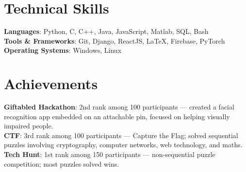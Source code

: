 \documentclass[a4paper,10pt]{article}
\begin{document}
\section{Technical Skills}
 \begin{itemize}[leftmargin=0.15in, label={}]
    \small{\item{
     \textbf{Languages}{: Python, C, C++, Java, JavaScript, Matlab, SQL, Bash} \\
     \textbf{Tools \& Frameworks}{: Git, Django, ReactJS, \LaTeX, Firebase, PyTorch} \\
     \textbf{Operating Systems}{: Windows, Linux}
    }}
 \end{itemize}


\section{Achievements}
 \begin{itemize}[leftmargin=0.15in, label={}]
    \small{\item{
     \textbf{Giftabled Hackathon}{: 2nd rank among 100 participants --- created a facial recognition app embedded on an attachable pin, focused on helping visually impaired people.} \\
     \textbf{CTF}{: 3rd rank among 100 participants --- Capture the Flag; solved sequential puzzles involving cryptography, computer networks, web technology, and maths.} \\
     \textbf{Tech Hunt}{: 1st rank among 150 participants --- non-sequential puzzle competition; most puzzles solved wins.}
    }}
 \end{itemize}


\end{document}
